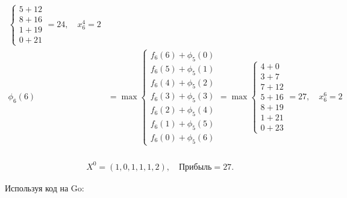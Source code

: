 \documentclass{article}
\begin{document}
\[\begin{aligned}
\begin{cases}
                                                  5 + 12 \\
                                                  8 + 16 \\
                                                  1 + 19 \\
                                                  0 + 21
                                              \end{cases} = 24, \quad x_6^4 = 2               \\
        \phi_6(6) & = \max \begin{cases}
                               f_6(6) + \phi_5(0) \\
                               f_6(5) + \phi_5(1) \\
                               f_6(4) + \phi_5(2) \\
                               f_6(3) + \phi_5(3) \\
                               f_6(2) + \phi_5(4) \\
                               f_6(1) + \phi_5(5) \\
                               f_6(0) + \phi_5(6)
                           \end{cases} = \max \begin{cases}
                                                  4 + 0  \\
                                                  3 + 7  \\
                                                  7 + 12 \\
                                                  5 + 16 \\
                                                  8 + 19 \\
                                                  1 + 21 \\
                                                  0 + 23
                                              \end{cases} = 27, \quad x_6^6 = 2               \\
    \end{aligned}
\]

\[
    \begin{aligned}
         & X^0 = (1, 0, 1, 1, 1, 2), \quad \text{Прибыль} = 27.
    \end{aligned}
\]

Используя код на Go:
\end{document}
